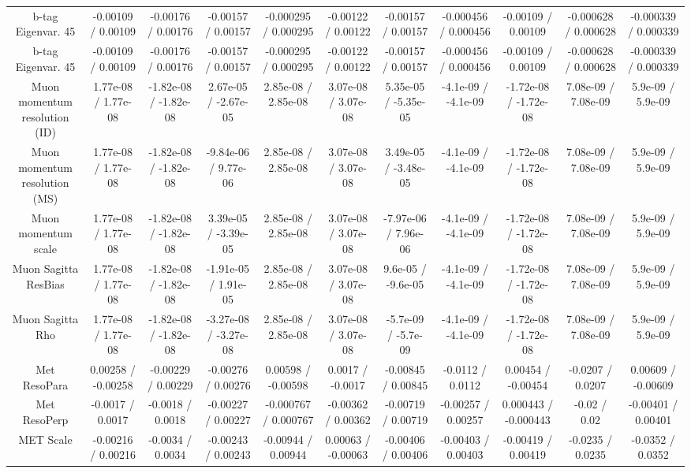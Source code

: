 \begin{table}[htbp]
\begin{center}
\begin{tabular}{|c|c|c|c|c|c|c|c|c|c|c|}
  b-tag Eigenvar. 45 & -0.00109 / 0.00109 & -0.00176 / 0.00176 & -0.00157 / 0.00157 & -0.000295 / 0.000295 & -0.00122 / 0.00122 & -0.00157 / 0.00157 & -0.000456 / 0.000456 & -0.00109 / 0.00109 & -0.000628 / 0.000628 & -0.000339 / 0.000339 \\ 
  b-tag Eigenvar. 45 & -0.00109 / 0.00109 & -0.00176 / 0.00176 & -0.00157 / 0.00157 & -0.000295 / 0.000295 & -0.00122 / 0.00122 & -0.00157 / 0.00157 & -0.000456 / 0.000456 & -0.00109 / 0.00109 & -0.000628 / 0.000628 & -0.000339 / 0.000339 \\ 
  Muon momentum resolution (ID) & 1.77e-08 / 1.77e-08 & -1.82e-08 / -1.82e-08 & 2.67e-05 / -2.67e-05 & 2.85e-08 / 2.85e-08 & 3.07e-08 / 3.07e-08 & 5.35e-05 / -5.35e-05 & -4.1e-09 / -4.1e-09 & -1.72e-08 / -1.72e-08 & 7.08e-09 / 7.08e-09 & 5.9e-09 / 5.9e-09 \\ 
  Muon momentum resolution (MS) & 1.77e-08 / 1.77e-08 & -1.82e-08 / -1.82e-08 & -9.84e-06 / 9.77e-06 & 2.85e-08 / 2.85e-08 & 3.07e-08 / 3.07e-08 & 3.49e-05 / -3.48e-05 & -4.1e-09 / -4.1e-09 & -1.72e-08 / -1.72e-08 & 7.08e-09 / 7.08e-09 & 5.9e-09 / 5.9e-09 \\ 
  Muon momentum scale & 1.77e-08 / 1.77e-08 & -1.82e-08 / -1.82e-08 & 3.39e-05 / -3.39e-05 & 2.85e-08 / 2.85e-08 & 3.07e-08 / 3.07e-08 & -7.97e-06 / 7.96e-06 & -4.1e-09 / -4.1e-09 & -1.72e-08 / -1.72e-08 & 7.08e-09 / 7.08e-09 & 5.9e-09 / 5.9e-09 \\ 
  Muon Sagitta ResBias & 1.77e-08 / 1.77e-08 & -1.82e-08 / -1.82e-08 & -1.91e-05 / 1.91e-05 & 2.85e-08 / 2.85e-08 & 3.07e-08 / 3.07e-08 & 9.6e-05 / -9.6e-05 & -4.1e-09 / -4.1e-09 & -1.72e-08 / -1.72e-08 & 7.08e-09 / 7.08e-09 & 5.9e-09 / 5.9e-09 \\ 
  Muon Sagitta Rho & 1.77e-08 / 1.77e-08 & -1.82e-08 / -1.82e-08 & -3.27e-08 / -3.27e-08 & 2.85e-08 / 2.85e-08 & 3.07e-08 / 3.07e-08 & -5.7e-09 / -5.7e-09 & -4.1e-09 / -4.1e-09 & -1.72e-08 / -1.72e-08 & 7.08e-09 / 7.08e-09 & 5.9e-09 / 5.9e-09 \\ 
  Met ResoPara & 0.00258 / -0.00258 & -0.00229 / 0.00229 & -0.00276 / 0.00276 & 0.00598 / -0.00598 & 0.0017 / -0.0017 & -0.00845 / 0.00845 & -0.0112 / 0.0112 & 0.00454 / -0.00454 & -0.0207 / 0.0207 & 0.00609 / -0.00609 \\ 
  Met ResoPerp & -0.0017 / 0.0017 & -0.0018 / 0.0018 & -0.00227 / 0.00227 & -0.000767 / 0.000767 & -0.00362 / 0.00362 & -0.00719 / 0.00719 & -0.00257 / 0.00257 & 0.000443 / -0.000443 & -0.02 / 0.02 & -0.00401 / 0.00401 \\ 
  MET Scale & -0.00216 / 0.00216 & -0.0034 / 0.0034 & -0.00243 / 0.00243 & -0.00944 / 0.00944 & 0.00063 / -0.00063 & -0.00406 / 0.00406 & -0.00403 / 0.00403 & -0.00419 / 0.00419 & -0.0235 / 0.0235 & -0.0352 / 0.0352 \\ 

\end{tabular}
\end{center}
\end{table}
